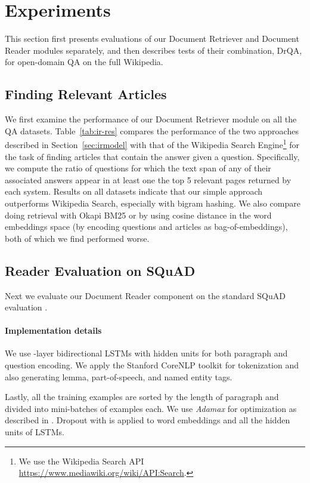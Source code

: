 \documentclass[11pt,a4paper]{article}
\newcommand\us{DrQA\xspace}
\newcommand\usr{Document Retriever\xspace}
\newcommand\usp{Document Reader\xspace}
\begin{document}
\section{Experiments} \label{sec:exp}

This section first presents evaluations of our Document Retriever and Document Reader modules separately, and then describes tests of their combination, \us, for open-domain QA on the full Wikipedia.

\subsection{Finding Relevant Articles}
We first examine the performance of our \usr module on all the QA datasets. Table~\ref{tab:ir-res} compares the performance of the two approaches described in Section~\ref{sec:irmodel} with that of the Wikipedia Search Engine\footnote{We use the Wikipedia Search API \url{https://www.mediawiki.org/wiki/API:Search}.} for the task of finding articles that contain the answer given a question.
Specifically, we compute the ratio of questions for which the text span of any of their associated answers appear in at least one the top 5 relevant pages returned by each system.
Results on all datasets indicate that our simple approach outperforms Wikipedia Search, especially with bigram hashing.
We also compare doing retrieval with Okapi BM25 or by using cosine distance in the word embeddings space (by encoding questions and articles as bag-of-embeddings), both of which we find performed worse.


\subsection{Reader Evaluation on SQuAD}
Next we evaluate our \usp component on the standard SQuAD evaluation \cite{rajpurkar2016squad}.
\paragraph{Implementation details}
We use -layer bidirectional LSTMs with  hidden units for both paragraph and question encoding.
We apply the Stanford CoreNLP toolkit \cite{manning2014stanford} for tokenization and also generating lemma, part-of-speech, and named entity tags.

Lastly, all the training examples are sorted by the length of paragraph and divided into mini-batches of  examples each. We use \emph{Adamax} for optimization as described in \cite{kingma2014adam}. Dropout with  is applied to word embeddings and all the hidden units of LSTMs.
\end{document}
